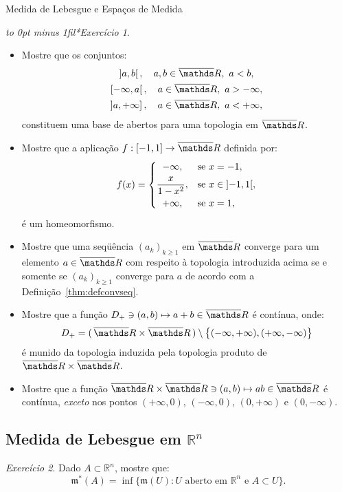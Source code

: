 \documentclass[oneside,final,11pt]{amsbook}
\newcommand{\R}{\mathds R}
\newcommand{\leb}{\mathfrak m}
\theoremstyle{remark}\newtheorem{exercise}{Exercício}[chapter]
\theoremstyle{remark}\newtheorem{*exercise}[exercise]{\hbox to 0pt{\hskip 0pt minus 1fil*}Exercício}
\theoremstyle{definition}\newtheorem{exdefin}{Definição}[chapter]
\theoremstyle{plain}\newtheorem{teo}{Teorema}[section]
\theoremstyle{plain}\newtheorem{lem}[teo]{Lema}
\theoremstyle{plain}\newtheorem{prop}[teo]{Proposição}
\theoremstyle{plain}\newtheorem{cor}[teo]{Corolário}
\theoremstyle{definition}\newtheorem{defin}[teo]{Definição}
\theoremstyle{remark}\newtheorem{rem}[teo]{Observação}
\theoremstyle{definition}\newtheorem{notation}[teo]{Notação}
\theoremstyle{definition}\newtheorem{convention}[teo]{Convenção}
\theoremstyle{definition}\newtheorem{example}[teo]{Exemplo}
\numberwithin{section}{chapter}
\numberwithin{equation}{section}
\begin{document}
\begin{chapter}{Medida de Lebesgue e Espaços de Medida}
\begin{*exercise}\label{exe:topologiaRbar}\
\begin{itemize}
\item Mostre que os conjuntos:
\begin{gather*}
\left]a,b\right[,\quad a,b\in\overline\R,\ a<b,\\
\left[-\infty,a\right[,\quad a\in\overline\R,\ a>-\infty,\\
\left]a,+\infty\right],\quad a\in\overline\R,\ a<+\infty,
\end{gather*}
constituem uma base de abertos para uma topologia em $\overline\R$.
\item Mostre que a aplicação $f:[-1,1]\to\overline\R$ definida por:
\[f(x)=\begin{cases}
\hfil-\infty,&\text{se $x=-1$},\\[3pt]
\dfrac x{1-x^2},&\text{se $x\in\left]-1,1\right[$},\\[5pt]
\hfil+\infty,&\text{se $x=1$},
\end{cases}\]
é um homeomorfismo.
\item Mostre que uma seqüência $(a_k)_{k\ge1}$ em $\overline\R$ converge para um elemento
$a\in\overline\R$ com respeito à topologia introduzida acima se e somente se $(a_k)_{k\ge1}$
converge para $a$ de acordo com a Definição~\ref{thm:defconvseq}.
\item Mostre que a função $D_+\ni(a,b)\mapsto a+b\in\overline\R$ é contínua, onde:
\[D_+=(\,\overline\R\times\overline\R\,)\setminus\big\{(-\infty,+\infty),(+\infty,-\infty)\big\}\]
é munido da topologia induzida pela topologia produto de $\overline\R\times\overline\R$.
\item Mostre que a função $\overline\R\times\overline\R\ni(a,b)\mapsto ab\in\overline\R$
é contínua, {\em exceto\/} nos pontos $(+\infty,0)$, $(-\infty,0)$, $(0,+\infty)$ e $(0,-\infty)$.
\end{itemize}
\end{*exercise}

\subsection*{Medida de Lebesgue em ${\R^n}$}

\begin{exercise}\label{exe:lebouterreg}
Dado $A\subset\R^n$, mostre que:
\[\leb^*(A)=\inf\big\{\leb(U):\text{$U$ aberto em $\R^n$ e $A\subset U$}\big\}.\]
\end{exercise}


\end{chapter}
\end{document}
